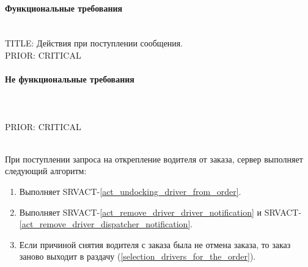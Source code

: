     \paragraph{Функциональные требования} \mbox{}\\

      TITLE: Действия при поступлении сообщения.
     	\\
      PRIOR: CRITICAL\\

    \paragraph{Не функциональные требования} \mbox{}\\

      \\
      PRIOR: CRITICAL\\


    	\begin{alg}  \label{remove_driver_from_order_alg} \mbox{}\\

        При поступлении запроса на открепление водителя от заказа, сервер выполняет следующий алгоритм:

        \begin{enumerate}
          \item Выполняет SRVACT-\ref{act_undocking_driver_from_order}.
          \item Выполняет SRVACT-\ref{act_remove_driver_driver_notification} и SRVACT-\ref{act_remove_driver_dispatcher_notification}.
          \item Если причиной снятия водителя с заказа была не отмена заказа, то заказ заново выходит в раздачу (\ref{selection_drivers_for_the_order}).
        \end{enumerate}
      \end{alg}

